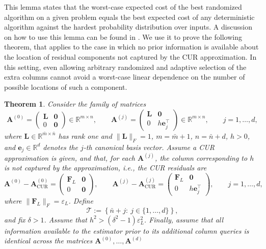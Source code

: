 \documentclass[11pt]{article}
\newtheorem{theorem}{Theorem}
\begin{document}
This lemma states that the worst-case expected cost of the best randomized algorithm on a given problem equals the best expected cost of any deterministic algorithm against the hardest probability distribution over inputs. A discussion on how to use this lemma can be found in \cite{halikias2026transposefreelinearalgebra}. We use it to prove the following theorem, that applies to the case in which no prior information is available about the location of residual components not captured by the CUR approximation. In this setting, even allowing arbitrary randomized and adaptive selection of the extra columns cannot avoid a worst-case linear dependence on the number of possible locations of such a component.
\begin{theorem}
    Consider the family of matrices
    \begin{equation}
        \mathbf{A}^{(0)}
        =
        \begin{pmatrix}
            \mathbf{L} & \mathbf{0} \\
            0          & \mathbf{0}
        \end{pmatrix}
        \in\mathbb{R}^{m\times n},
        \qquad
        \mathbf{A}^{(j)}
        =
        \begin{pmatrix}
            \mathbf{L} & \mathbf{0}         \\
            0          & h\mathbf{e}_j^\top
        \end{pmatrix}
        \in\mathbb{R}^{m\times n},
        \qquad j=1,\ldots,d,
    \end{equation}
    where $\mathbf{L}\in\mathbb{R}^{\bar m\times\bar n}$ has rank one and
    $\|\mathbf{L}\|_F=1$, $m=\bar m+1$, $n=\bar n+d$, $h>0$, and
    $\mathbf{e}_j\in\mathbb{R}^d$ denotes the $j$-th canonical basis vector.
    Assume a CUR approximation is given, and that, for each $\mathbf{A}^{(j)}$,
    the column corresponding to $h$ is not captured by the approximation, i.e.,
    the CUR residuals are
    \begin{equation}
        \mathbf{A}^{(0)}-\mathbf{A}^{(0)}_{\mathrm{CUR}}
        =
        \begin{pmatrix}
            \mathbf{F}_L & \mathbf{0} \\
            0            & \mathbf{0}
        \end{pmatrix},
        \qquad
        \mathbf{A}^{(j)}-\mathbf{A}^{(j)}_{\mathrm{CUR}}
        =
        \begin{pmatrix}
            \mathbf{F}_L & \mathbf{0}         \\
            0            & h\mathbf{e}_j^\top
        \end{pmatrix},
        \qquad j=1,\ldots,d,
    \end{equation}
    where $\|\mathbf{F}_L\|_F=\varepsilon_L$. Define
    \begin{equation}
        \mathcal{T}
        :=
        \left\{
        \bar n+j:\ j\in\{1,\ldots,d\}
        \right\},
    \end{equation}
    and fix $\delta>1$. Assume that
    $h^2>(\delta^2-1)\varepsilon_L^2$. Finally, assume that all information available to the estimator prior to its additional column queries is identical across the matrices $\mathbf{A}^{(0)}, \dots,\mathbf{A}^{(d)}$


\end{theorem}
\end{document}
